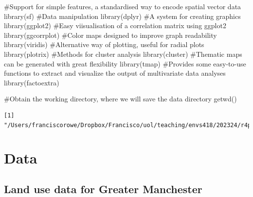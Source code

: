 \documentclass[
  letterpaper,
  DIV=11,
  numbers=noendperiod]{scrreprt}
\newenvironment{Shaded}{\begin{snugshade}}{\end{snugshade}}
\newcommand{\CommentTok}[1]{\textcolor[rgb]{0.37,0.37,0.37}{#1}}
\newcommand{\FunctionTok}[1]{\textcolor[rgb]{0.28,0.35,0.67}{#1}}
\newcommand{\NormalTok}[1]{\textcolor[rgb]{0.00,0.23,0.31}{#1}}
\begin{document}
\begin{Shaded}
\begin{Highlighting}[]
\CommentTok{\#Support for simple features, a standardised way to encode spatial vector data}
\FunctionTok{library}\NormalTok{(sf)}
\CommentTok{\#Data manipulation}
\FunctionTok{library}\NormalTok{(dplyr)}
\CommentTok{\#A system for creating graphics}
\FunctionTok{library}\NormalTok{(ggplot2)}
\CommentTok{\#Easy viisualisation of a correlation matrix using ggplot2}
\FunctionTok{library}\NormalTok{(ggcorrplot)}
\CommentTok{\#Color maps designed to improve graph readability}
\FunctionTok{library}\NormalTok{(viridis)}
\CommentTok{\#Alternative way of plotting, useful for radial plots}
\FunctionTok{library}\NormalTok{(plotrix)}
\CommentTok{\#Methods for cluster analysis}
\FunctionTok{library}\NormalTok{(cluster)}
\CommentTok{\#Thematic maps can be generated with great flexibility}
\FunctionTok{library}\NormalTok{(tmap)}
\CommentTok{\#Provides some easy{-}to{-}use functions to extract and visualize the output of multivariate data analyses}
\FunctionTok{library}\NormalTok{(factoextra)}
\end{Highlighting}
\end{Shaded}

\begin{Shaded}
\begin{Highlighting}[]
 \CommentTok{\#Obtain the working directory, where we will save the data directory}
\FunctionTok{getwd}\NormalTok{()}
\end{Highlighting}
\end{Shaded}

\begin{verbatim}
[1] "/Users/franciscorowe/Dropbox/Francisco/uol/teaching/envs418/202324/r4ps"
\end{verbatim}

\hypertarget{sec-sec32}{%
\section{Data}\label{sec-sec32}}

\hypertarget{land-use-data-for-greater-manchester}{%
\subsection{Land use data for Greater
Manchester}\label{land-use-data-for-greater-manchester}}
\end{document}
